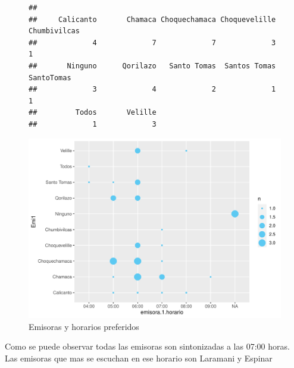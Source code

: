 \documentclass[12pt]{article}\usepackage[]{graphicx}\usepackage[]{xcolor}
\makeatletter
\def\maxwidth{ %
  \ifdim\Gin@nat@width>\linewidth
    \linewidth
  \else
    \Gin@nat@width
  \fi
}
\newenvironment{kframe}{%
 \def\at@end@of@kframe{}%
 \ifinner\ifhmode%
  \def\at@end@of@kframe{\end{minipage}}%
  \begin{minipage}{\columnwidth}%
 \fi\fi%
 \def\FrameCommand##1{\hskip\@totalleftmargin \hskip-\fboxsep
 \colorbox{shadecolor}{##1}\hskip-\fboxsep
     \hskip-\linewidth \hskip-\@totalleftmargin \hskip\columnwidth}%
 \MakeFramed {\advance\hsize-\width
   \@totalleftmargin\z@ \linewidth\hsize
   \@setminipage}}%
 {\par\unskip\endMakeFramed%
 \at@end@of@kframe}
\newenvironment{knitrout}{}{} %
\makeatother
\begin{document}
	\begin{figure}[H]
	\centering
\begin{knitrout}
\color{fgcolor}\begin{kframe}
\begin{verbatim}
## 
##     Calicanto       Chamaca Choquechamaca Choquevelille  Chumbivilcas 
##             4             7             7             3             1 
##       Ninguno      Qorilazo   Santo Tomas  Santos Tomas    SantoTomas 
##             3             4             2             1             1 
##         Todos       Velille 
##             1             3
\end{verbatim}
\end{kframe}
\includegraphics[width=\maxwidth]{figure/three-1} 
\end{knitrout}
	\caption{Emisoras y horarios preferidos}
	\end{figure}
	Como se puede observar todas las emisoras son sintonizadas a las 07:00 horas. Las emisoras que mas se escuchan en ese horario son Laramani y Espinar\\
	\\
	
\end{document}
